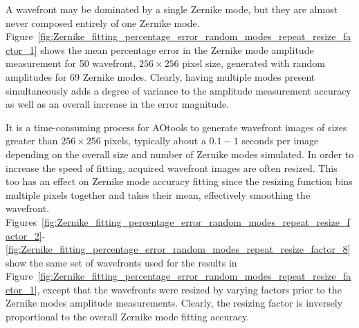 A wavefront may be dominated by a single Zernike mode, but they are almost 
never composed entirely of one Zernike mode. 
Figure~\ref{fig:Zernike_fitting_percentage_error_random_modes_repeat_resize_factor_1} shows the mean percentage error in the Zernike mode amplitude 
measurement for 50 wavefront, $256\times256$ pixel size, generated with 
random amplitudes for 69 Zernike modes. Clearly, having multiple modes 
present simultaneously adds a degree of variance to the amplitude 
measurement accuracy as well as an overall increase in the error magnitude.

It is a time-consuming process for AOtools to generate wavefront images of 
sizes greater than $256\times256$ pixels, typically about a $0.1-1$ seconds 
per image depending on the overall size and number of Zernike modes 
simulated. In order to increase the speed of fitting, acquired wavefront 
images are often resized. This too has an effect on Zernike mode accuracy 
fitting since the resizing function bins multiple pixels together and takes 
their mean, effectively smoothing the wavefront. 
Figures~\ref{fig:Zernike_fitting_percentage_error_random_modes_repeat_resize_factor_2}-\ref{fig:Zernike_fitting_percentage_error_random_modes_repeat_resize_factor_8} show the same set of wavefronts used for the results in 
Figure~\ref{fig:Zernike_fitting_percentage_error_random_modes_repeat_resize_factor_1}, except that the wavefronts were resized by varying factors prior to the Zernike modes amplitude measurements. Clearly, the resizing factor is inversely proportional to the overall Zernike mode fitting accuracy.

